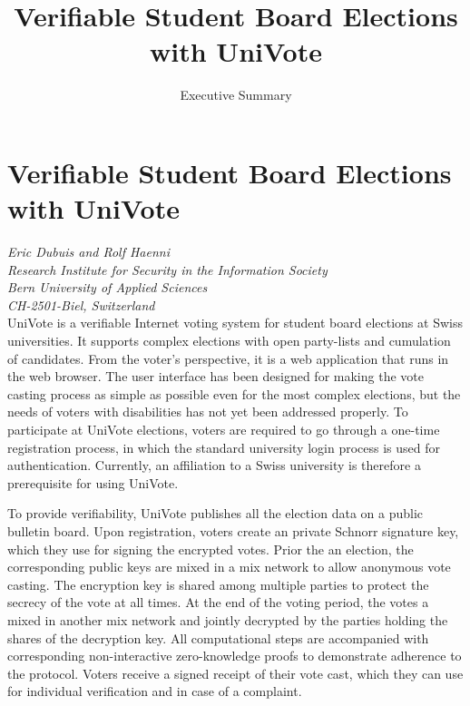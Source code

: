 \documentclass[bibtotoc,halfparskip,oneside]{scrreprt}
\begin{document}
\title{Verifiable Student Board Elections with UniVote}
\subtitle{Executive Summary}

%

\chapter*{Verifiable Student Board Elections with UniVote}

\emph{Eric Dubuis and Rolf Haenni\\Research Institute for Security in the Information Society\\Bern University of Applied Sciences\\CH-2501-Biel, Switzerland}\\

UniVote is a verifiable Internet voting system for student board elections at Swiss universities. It supports complex elections with open party-lists and cumulation of candidates. From the voter's perspective, it is a web application that runs in the web browser. The user interface has been designed for making the vote casting process as simple as possible even for the most complex elections, but the needs of voters with disabilities has not yet been addressed properly. To participate at UniVote elections, voters are required to go through a one-time registration process, in which the standard university login process is used for authentication. Currently, an affiliation to a Swiss university is therefore a prerequisite for using UniVote.

To provide verifiability, UniVote publishes all the election data on a public bulletin board. Upon registration, voters create an private Schnorr signature key, which they use for signing the encrypted votes. Prior the an election, the corresponding public keys are mixed in a mix network to allow anonymous vote casting. The encryption key is shared among multiple parties to protect the secrecy of the vote at all times. At the end of the voting period, the votes a mixed in another mix network and jointly decrypted by the parties holding the shares of the decryption key. All computational steps are accompanied with corresponding non-interactive zero-knowledge proofs to demonstrate adherence to the protocol. Voters receive a signed receipt of their vote cast, which they can use for individual verification and in case of a complaint.
\end{document}
